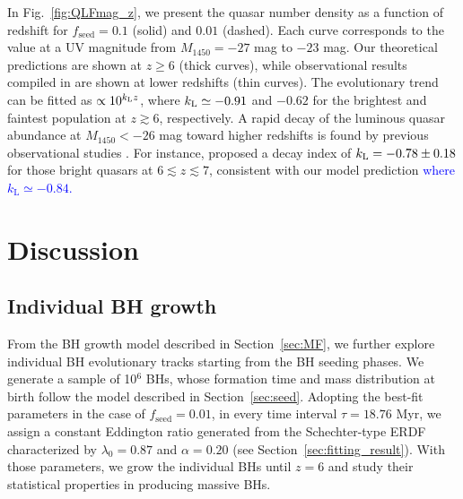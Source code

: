 \documentclass[twocolumn, twocolappendix]{aastex63}
\newcommand{\tlife}{\tau}
\newcommand{\fseed}{f_\mathrm{seed}}
\newcommand{\Muv}{M_{1450}}
\newcommand{\blue}[1]{\textcolor{blue}{ #1}}
\begin{document}
\begin{CJK*}{UTF8}{gbsn}
In Fig.~\ref{fig:QLFmag_z}, we present the quasar number density as a function of redshift for 
$\fseed =0.1$ (solid) and $0.01$ (dashed).
Each curve corresponds to the value at a UV magnitude from $\Muv=-27$ mag to $-23$ mag.
Our theoretical predictions are shown at $z\geq 6$ (thick curves),
while observational results compiled in \cite{2020ApJ...904...89N} are shown at lower redshifts (thin curves).
The evolutionary trend can be fitted as $\propto 10^{k_{\rm L}z}$,
where $k_{\rm L}\simeq -0.91$ and $-0.62$ for the brightest and faintest population
at $z\gtrsim 6$, respectively.
A rapid decay of the luminous quasar abundance at $\Muv<-26$ mag toward higher redshifts is found by 
previous observational studies \citep[e.g.,][]{2001AJ....122.2833F,2013ApJ...768..105M,2016ApJ...833..222J,2019ApJ...884...30W}.
For instance, \citet{2019ApJ...884...30W} proposed a decay index of $k_{\rm L}=-0.78\pm{0.18}$ for those bright quasars at $6\lesssim z \lesssim 7$,
consistent with our model prediction \blue{where $k_\mathrm{L} \simeq -0.84$.}


\vspace{2mm}
\section{Discussion}\label{sec:discussion}
\vspace{2mm}
\subsection{Individual BH growth}\label{sec:evol}

From the BH growth model described in Section~\ref{sec:MF}, we further explore individual BH evolutionary tracks starting from the BH seeding phases.
We generate a sample of 10$^6$ BHs, whose formation time and mass distribution at birth follow the model described in Section~\ref{sec:seed}. 
Adopting the best-fit parameters in the case of $\fseed = 0.01$, in every time interval $\tlife=18.76$ Myr,
we assign a constant Eddington ratio generated from the Schechter-type ERDF characterized by $\lambda_0=0.87$ and $\alpha=0.20$ 
(see Section~\ref{sec:fitting_result}).
With those parameters, we grow the individual BHs until $z=6$ and study their statistical properties in producing massive BHs.



\end{CJK*}
\end{document}
